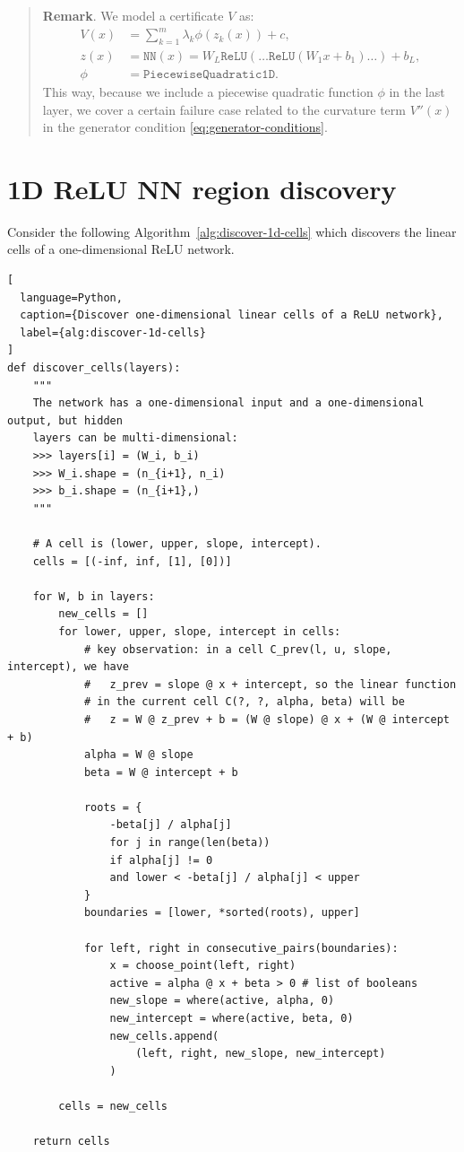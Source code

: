 \documentclass[10pt]{extarticle}
\begin{document}
\begin{quote} 
  \textbf{Remark}. \label{remark:piecewise-quadratic} We model a certificate $V$ as:
  \begin{align}
    V(x) &= \sum_{k=1}^m \lambda_k\phi(z_k(x))+c, \\
    z(x) &= \texttt{NN}(x)
      = W_L\texttt{ReLU}(\ldots\texttt{ReLU}(W_1x+b_1)\ldots)+b_L, \\
    \phi &= \texttt{PiecewiseQuadratic1D}.
  \end{align}
  This way, because we include a piecewise quadratic function $\phi$ in the last layer, 
  we cover a certain failure case related to the curvature term $V''(x)$ in the 
  generator condition \eqref{eq:generator-conditions}.    
\end{quote}


\section{1D ReLU NN region discovery}

Consider the following Algorithm~\ref{alg:discover-1d-cells}  which discovers the linear cells of a one-dimensional ReLU network.

\begin{lstlisting}[
  language=Python,
  caption={Discover one-dimensional linear cells of a ReLU network},
  label={alg:discover-1d-cells}
]
def discover_cells(layers):
    """
    The network has a one-dimensional input and a one-dimensional output, but hidden
    layers can be multi-dimensional:
    >>> layers[i] = (W_i, b_i)
    >>> W_i.shape = (n_{i+1}, n_i)
    >>> b_i.shape = (n_{i+1},)    
    """

    # A cell is (lower, upper, slope, intercept).
    cells = [(-inf, inf, [1], [0])]

    for W, b in layers:
        new_cells = []
        for lower, upper, slope, intercept in cells:
            # key observation: in a cell C_prev(l, u, slope, intercept), we have 
            #   z_prev = slope @ x + intercept, so the linear function 
            # in the current cell C(?, ?, alpha, beta) will be
            #   z = W @ z_prev + b = (W @ slope) @ x + (W @ intercept + b)
            alpha = W @ slope
            beta = W @ intercept + b

            roots = {
                -beta[j] / alpha[j]
                for j in range(len(beta))
                if alpha[j] != 0
                and lower < -beta[j] / alpha[j] < upper
            }
            boundaries = [lower, *sorted(roots), upper]

            for left, right in consecutive_pairs(boundaries):
                x = choose_point(left, right)
                active = alpha @ x + beta > 0 # list of booleans
                new_slope = where(active, alpha, 0)
                new_intercept = where(active, beta, 0)
                new_cells.append(
                    (left, right, new_slope, new_intercept)
                )

        cells = new_cells

    return cells
\end{lstlisting}
\end{document}
